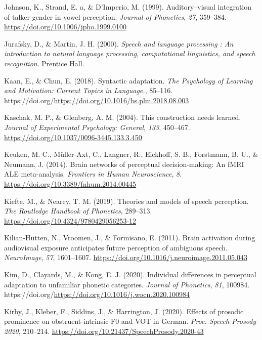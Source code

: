 \documentclass[
  11pt,
  english,
  man,floatsintext]{apa6}
\newlength{\cslhangindent}
\newlength{\cslentryspacingunit} %
\newenvironment{CSLReferences}[2] %
 {%
  \setlength{\parindent}{0pt}
  \ifodd #1
  \let\oldpar\par
  \def\par{\hangindent=\cslhangindent\oldpar}
  \fi
  \setlength{\parskip}{#2\cslentryspacingunit}
 }%
 {}
\begin{document}
\begin{CSLReferences}{1}{0}
\leavevmode{}%
Johnson, K., Strand, E. a, \& D'Imperio, M. (1999). Auditory--visual integration of talker gender in vowel perception. \emph{Journal of Phonetics}, \emph{27}, 359--384. \url{https://doi.org/10.1006/jpho.1999.0100}

\leavevmode{}%
Jurafsky, D., \& Martin, J. H. (2000). \emph{Speech and language processing : An introduction to natural language processing, computational linguistics, and speech recognition}. Prentice Hall.

\leavevmode{}%
Kaan, E., \& Chun, E. (2018). Syntactic adaptation. \emph{The Psychology of Learning and Motivation: Current Topics in Language.}, 85--116. https://doi.org/\url{https://doi.org/10.1016/bs.plm.2018.08.003}

\leavevmode{}%
Kaschak, M. P., \& Glenberg, A. M. (2004). This construction needs learned. \emph{Journal of Experimental Psychology: General}, \emph{133}, 450--467. \url{https://doi.org/10.1037/0096-3445.133.3.450}

\leavevmode{}%
Keuken, M. C., Müller-Axt, C., Langner, R., Eickhoff, S. B., Forstmann, B. U., \& Neumann, J. (2014). Brain networks of perceptual decision-making: An fMRI ALE meta-analysis. \emph{Frontiers in Human Neuroscience}, \emph{8}. \url{https://doi.org/10.3389/fnhum.2014.00445}

\leavevmode{}%
Kiefte, M., \& Nearey, T. M. (2019). Theories and models of speech perception. \emph{The Routledge Handbook of Phonetics}, 289--313. \url{https://doi.org/10.4324/9780429056253-12}

\leavevmode{}%
Kilian-Hütten, N., Vroomen, J., \& Formisano, E. (2011). Brain activation during audiovisual exposure anticipates future perception of ambiguous speech. \emph{NeuroImage}, \emph{57}, 1601--1607. \url{https://doi.org/10.1016/j.neuroimage.2011.05.043}

\leavevmode{}%
Kim, D., Clayards, M., \& Kong, E. J. (2020). Individual differences in perceptual adaptation to unfamiliar phonetic categories. \emph{Journal of Phonetics}, \emph{81}, 100984. https://doi.org/\url{https://doi.org/10.1016/j.wocn.2020.100984}

\leavevmode{}%
Kirby, J., Kleber, F., Siddins, J., \& Harrington, J. (2020). Effects of prosodic prominence on obstruent-intrinsic F0 and VOT in {German}. \emph{Proc. Speech Prosody 2020}, 210--214. \url{https://doi.org/10.21437/SpeechProsody.2020-43}


\end{CSLReferences}
\end{document}
